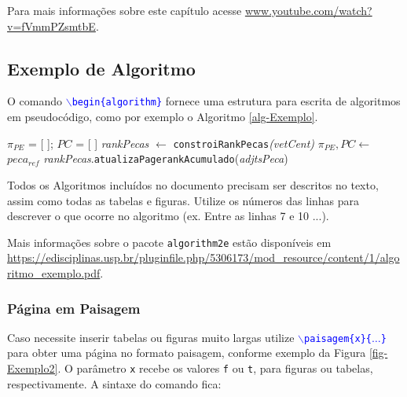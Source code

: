 Para mais informações sobre este capítulo acesse \url{www.youtube.com/watch?v=fVmmPZsmtbE}.

\subsection{Exemplo de Algoritmo}
\label{ssec:alg}

O comando \textcolor{blue}{\texttt{$\backslash$begin\{algorithm\}}} fornece uma estrutura para escrita de algoritmos em pseudocódigo, como por exemplo o Algoritmo \ref{alg-Exemplo}. 
\begin{algorithm}[ht!]
    \normalem %
	$\pi_{PE}$ = [ ]; $PC$ = [ ]\;
	\textit{rankPecas} $\leftarrow$ \texttt{\normalsize{constroiRankPecas}}\textit{(vetCent)}\;
	$\pi_{PE}, PC \leftarrow$ $peca_{ref}$\;
    \textit{rankPecas}.\texttt{\normalsize{atualizaPagerankAcumulado}}(\textit{adjtsPeca})\;
    \caption{\textit{PieceRank}}
    \label{alg-Exemplo} %
\end{algorithm}

Todos os Algoritmos incluídos no documento precisam ser descritos no texto, assim como todas as tabelas e figuras. Utilize os números das linhas para descrever o que ocorre no algoritmo (ex. Entre as linhas 7 e 10 ...). 

Mais informações sobre o pacote \texttt{algorithm2e} estão disponíveis em \url{https://edisciplinas.usp.br/pluginfile.php/5306173/mod_resource/content/1/algoritmo_exemplo.pdf}.

\subsubsection{Página em Paisagem}

Caso necessite inserir tabelas ou figuras muito largas utilize \textcolor{blue}{\texttt{$\backslash$paisagem\{x\}\{$\ldots$\}}} para obter uma página no formato paisagem, conforme exemplo da Figura \ref{fig-Exemplo2}. O parâmetro \texttt{x} recebe os valores \texttt{f} ou \texttt{t}, para figuras ou tabelas, respectivamente. A sintaxe do comando fica:

